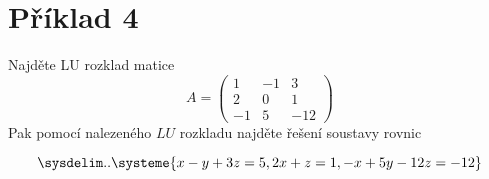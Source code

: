 \section*{Příklad 4}
Najděte LU rozklad matice
$$
A =
\begin{pmatrix}
  1  & -1 & 3   \\
  2  & 0  & 1   \\
  -1 & 5  & -12
\end{pmatrix}
$$
Pak pomocí nalezeného $LU$ rozkladu najděte řešení soustavy rovnic

\begin{equation*}
  \sysdelim..\systeme{
    x - y + 3z = 5,
    2x + z = 1,
    -x + 5y -12z = -12
  }
\end{equation*}
